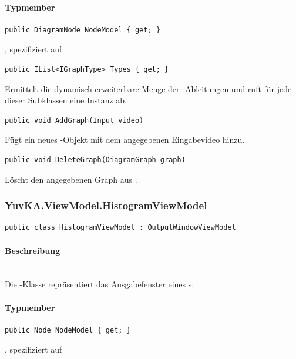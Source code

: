 \paragraph{Typmember}
\begin{itemize}

	\begin{verbatim}
public DiagramNode NodeModel { get; }
	\end{verbatim}
	, spezifiziert auf 

	\begin{verbatim}
public IList<IGraphType> Types { get; }
	\end{verbatim}
	Ermittelt die dynamisch erweiterbare Menge der -Ableitungen und ruft für jede dieser Subklassen eine Instanz ab.

	\begin{verbatim}
public void AddGraph(Input video)
	\end{verbatim}
	Fügt  ein neues -Objekt mit dem angegebenen Eingabevideo hinzu.

	\begin{verbatim}
public void DeleteGraph(DiagramGraph graph)
	\end{verbatim}
	Löscht den angegebenen Graph aus .


\end{itemize}

\subsubsection{YuvKA.ViewModel.HistogramViewModel}

\begin{verbatim}
public class HistogramViewModel : OutputWindowViewModel
\end{verbatim}

\paragraph{Beschreibung}~\\
Die -Klasse repräsentiert das Ausgabefenster eines s.

\paragraph{Typmember}
\begin{itemize}

	\begin{verbatim}
public Node NodeModel { get; }
	\end{verbatim}
	, spezifiziert auf 

\end{itemize}

